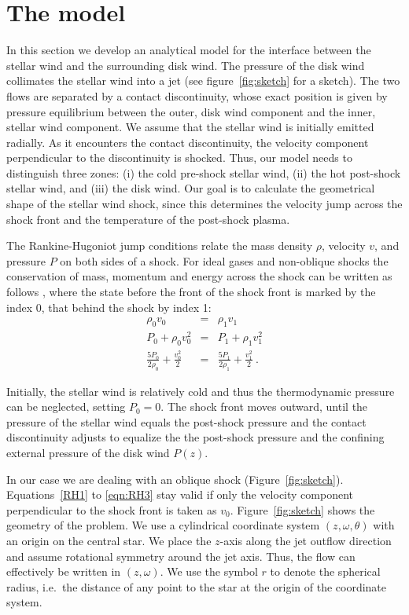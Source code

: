 \section{The model}
\label{sect:model}
In this section we develop an analytical model for the interface between the stellar wind and the surrounding disk wind. The pressure of the disk wind collimates the stellar wind into a jet (see figure~\ref{fig:sketch} for a sketch). The two flows are separated by a contact discontinuity, whose exact position is given by pressure equilibrium between the outer, disk wind component and the inner, stellar wind component. We assume that the stellar wind is initially emitted radially. As it encounters the contact discontinuity, the velocity component perpendicular to the discontinuity is shocked. Thus, our model needs to distinguish three zones: (i) the cold pre-shock stellar wind, (ii) the hot post-shock stellar wind, and (iii) the disk wind. Our goal is to calculate the geometrical shape of the stellar wind shock, since this determines the velocity jump across the shock front and the temperature of the post-shock plasma. 

The Rankine-Hugoniot jump conditions relate the mass density $\rho$, velocity $v$, and pressure $P$ on both sides of a shock. For ideal gases and non-oblique shocks the conservation of mass, momentum and energy across the shock can be written as follows \citep[][chap.~7]{1967pswh.book.....Z}, where the state before the front of the shock front is marked by the index 0, that behind the shock by index 1:
\begin{eqnarray}
\label{eqn:RH1}\rho_0 v_0 &=& \rho_1 v_1\\
\label{eqn:RH2}P_0+\rho_0 v_0^2 &=& P_1+\rho_1 v_1^2\\
\label{eqn:RH3}\frac{5 P_0}{2\rho_0}+\frac{v_0^2}{2}&=&\frac{5 P_1}{2\rho_1}+\frac{v_1^2}{2} \ .
\end{eqnarray}

Initially, the stellar wind is relatively cold and thus the thermodynamic pressure can be neglected, setting $P_0=0$.
The shock front moves outward, until the pressure of the stellar wind equals the post-shock pressure and the contact discontinuity adjusts to equalize the the post-shock pressure and the confining external pressure of the disk wind $P(z)$. 

In our case we are dealing with an oblique shock (Figure~\ref{fig:sketch}). Equations~\ref{RH1} to \ref{eqn:RH3} stay valid if only the velocity component perpendicular to the shock front is taken as $v_0$. 
Figure~\ref{fig:sketch} shows the geometry of the problem. We use a cylindrical coordinate system $(z, \omega, \theta)$ with an origin on the central star. We place the $z$-axis along the jet outflow direction and assume rotational symmetry around the jet axis. Thus, the flow can effectively be written in $(z,\omega)$. We use the symbol $r$ to denote the spherical radius, i.e.\ the distance of any point to the star at the origin of the coordinate system.

